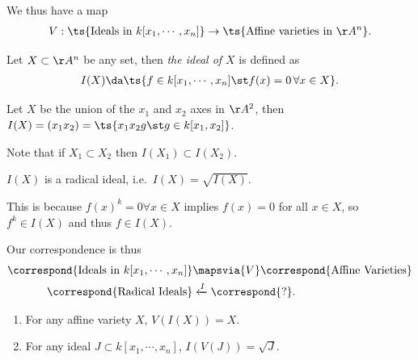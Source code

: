 We thus have a map
\begin{align*}  
V: \ts{\text{Ideals in } k[x_1, \cdots, x_n]} \to \ts{\text{Affine varieties in } \AA^n}
.\end{align*}

\begin{definition}

Let \(X\subset \AA^n\) be any set, then \emph{the ideal of \(X\)} is
defined as
\begin{align*}  
I(X) \da\ts{f\in k[x_1, \cdots, x_n] \st f(x) = 0\, \forall x\in X}
.\end{align*}

\end{definition}

\begin{example}

Let \(X\) be the union of the \(x_1\) and \(x_2\) axes in \(\AA^2\),
then \(I(X) = (x_1 x_2) = \ts {x_1 x_2 g\st g\in k[x_1, x_2]}\).

\end{example}

Note that if \(X_1 \subset X_2\) then \(I(X_1) \subset I(X_2)\).

\begin{proposition}

\(I(X)\) is a radical ideal, i.e.~\(I(X) = \sqrt{I(X)}\).

This is because \(f(x)^k = 0 \forall x\in X\) implies \(f(x) = 0\) for
all \(x\in X\), so \(f^k \in I(X)\) and thus \(f\in I(X)\).

\end{proposition}

Our correspondence is thus
\begin{align*}  
\correspond{\text{Ideals in } k[x_1, \cdots, x_n]} &\mapsvia{V} \correspond{\text{Affine Varieties}} \\
\correspond{\text{Radical Ideals}} &\xleftarrow{I} \correspond{\text{?}}
.\end{align*}

\begin{proposition}

\hfill

\begin{enumerate}
\def\labelenumi{\alph{enumi}.}
\item
  For any affine variety \(X\), \(V(I(X)) = X\).
\item
  For any ideal \(J \subset k[x_1, \cdots, x_n]\),
  \(I(V(J)) = \sqrt{J}\).
\end{enumerate}

\end{proposition}

